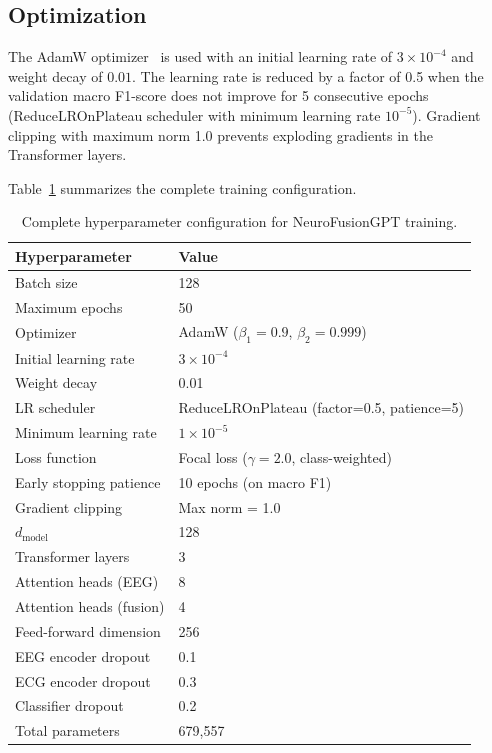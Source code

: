 \documentclass[12pt,letterpaper]{report}
\begin{document}
\subsection{Optimization}
\label{subsec:optimization}

The AdamW optimizer~\cite{loshchilov2019} is used with an initial learning rate of $3 \times 10^{-4}$ and weight decay of $0.01$. The learning rate is reduced by a factor of 0.5 when the validation macro F1-score does not improve for 5 consecutive epochs (ReduceLROnPlateau scheduler with minimum learning rate $10^{-5}$). Gradient clipping with maximum norm 1.0 prevents exploding gradients in the Transformer layers.

Table~\ref{tab:hyperparameters} summarizes the complete training configuration.

\begin{table}[H]
\centering
\caption[Training hyperparameter configuration]{Complete hyperparameter configuration for NeuroFusionGPT training.}
\label{tab:hyperparameters}
\begin{tabular}{ll}
\toprule
\textbf{Hyperparameter} & \textbf{Value} \\
\midrule
Batch size & 128 \\
Maximum epochs & 50 \\
Optimizer & AdamW ($\beta_1=0.9$, $\beta_2=0.999$) \\
Initial learning rate & $3 \times 10^{-4}$ \\
Weight decay & 0.01 \\
LR scheduler & ReduceLROnPlateau (factor=0.5, patience=5) \\
Minimum learning rate & $1 \times 10^{-5}$ \\
Loss function & Focal loss ($\gamma = 2.0$, class-weighted) \\
Early stopping patience & 10 epochs (on macro F1) \\
Gradient clipping & Max norm = 1.0 \\
$d_{\text{model}}$ & 128 \\
Transformer layers & 3 \\
Attention heads (EEG) & 8 \\
Attention heads (fusion) & 4 \\
Feed-forward dimension & 256 \\
EEG encoder dropout & 0.1 \\
ECG encoder dropout & 0.3 \\
Classifier dropout & 0.2 \\
Total parameters & 679,557 \\
\bottomrule
\end{tabular}
\end{table}
\end{document}
